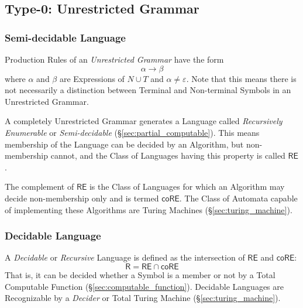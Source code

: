 \subsection{Type-0: Unrestricted Grammar}\label{sec:unrestricted_grammar}

\subsubsection{Semi-decidable Language}\label{sec:semidecidable}

Production Rules of an \emph{Unrestricted Grammar} have the form
\[
  \alpha \rightarrow \beta
\]
where $\alpha$ and $\beta$ are Expressions of $N \cup T$ and $\alpha \neq
\varepsilon$. Note that this means there is not necessarily a distinction
between Terminal and Non-terminal Symbols in an Unrestricted Grammar.

A completely Unrestricted Grammar generates a Language called \emph{Recursively
  Enumerable} or \emph{Semi-decidable} (\S\ref{sec:partial_computable}). This
means membership of the Language can be decided by an Algorithm, but
non-membership cannot, and the Class of Languages having this property is called
$\mathsf{RE}$.

The complement of $\mathsf{RE}$ is the Class of Languages for which an Algorithm
may decide non-membership only and is termed $\mathsf{coRE}$. The Class of
Automata capable of implementing these Algorithms are Turing Machines
(\S\ref{sec:turing_machine}).



\subsubsection{Decidable Language}\label{sec:decidable_language}

A \emph{Decidable} or \emph{Recursive} Language is defined as the intersection
of $\mathsf{RE}$ and $\mathsf{coRE}$:
\[
  \mathsf{R} = \mathsf{RE} \cap \mathsf{coRE}
\]
That is, it can be decided whether a Symbol is a member or not by a Total
Computable Function (\S\ref{sec:computable_function}). Decidable Languages are
Recognizable by a \emph{Decider} or Total Turing Machine
(\S\ref{sec:turing_machine}).\cite{kozen97}



